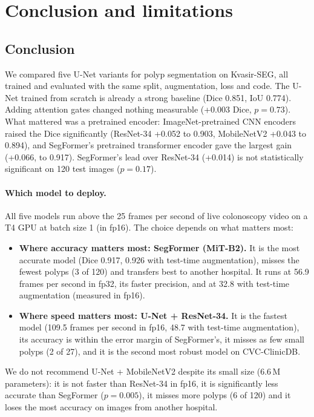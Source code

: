 \section{Conclusion and limitations}
\label{sec:concl}

\subsection{Conclusion}
\label{sec:conclusion}
We compared five U-Net variants for polyp segmentation on Kvasir-SEG, all trained and evaluated with the same
split, augmentation, loss and code. The U-Net trained from scratch is already a strong baseline (Dice 0.851,
IoU 0.774). Adding attention gates changed nothing measurable (+0.003 Dice, $p = 0.73$). What mattered was a
pretrained encoder: ImageNet-pretrained CNN encoders raised the Dice significantly (ResNet-34 +0.052 to 0.903,
MobileNetV2 +0.043 to 0.894), and SegFormer's pretrained transformer encoder gave the largest gain (+0.066, to
0.917). SegFormer's lead over ResNet-34 (+0.014) is not statistically significant on 120 test images ($p = 0.17$).

\paragraph{Which model to deploy.} All five models run above the 25 frames per second of live colonoscopy video on a T4
GPU at batch size 1 (in fp16). The choice depends on what matters most:
\begin{itemize}
  \item \textbf{Where accuracy matters most: SegFormer (MiT-B2).} It is the most accurate model (Dice 0.917, 0.926 with
        test-time augmentation), misses the fewest polyps (3 of 120) and transfers best to another hospital. It runs at
        56.9 frames per second in fp32, its faster precision, and at 32.8 with test-time augmentation (measured in fp16).
  \item \textbf{Where speed matters most: U-Net + ResNet-34.} It is the fastest model (109.5 frames per second in fp16, 48.7
        with test-time augmentation), its accuracy is within the error margin of SegFormer's, it misses as few small
        polyps (2 of 27), and it is the second most robust model on CVC-ClinicDB.
\end{itemize}
We do not recommend U-Net + MobileNetV2 despite its small size (6.6\,M parameters): it is not faster than
ResNet-34 in fp16, it is significantly less accurate than SegFormer ($p = 0.005$), it misses more polyps (6 of 120)
and it loses the most accuracy on images from another hospital.

